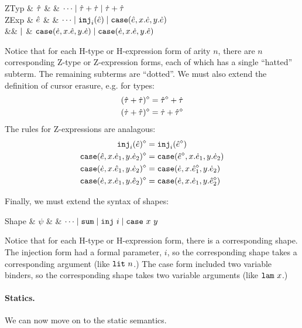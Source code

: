 \begin{grammar}
\textsf{ZTyp} & $\hat{\tau}$ & \bnfas & $\cdots \mathrel{\mid} {\hat{\tau}} + {\dot{\tau}} \mathrel{\mid} {\dot{\tau}} + {\hat{\tau}}$
\\
\textsf{ZExp} & $\hat{e}$ & \bnfas & $\cdots
\mathrel{\mid} \texttt{inj}_{i}({\hat{e}})
\mathrel{\mid} \texttt{case}({\hat{e}},{x}.{\dot{e}},{y}.{\dot{e}})$
\\
&& $\mathrel{\mid}$ & $\texttt{case}({\dot{e}},{x}.{\hat{e}},{y}.{\dot{e}})
\mathrel{\mid}\texttt{case}({\dot{e}},{x}.{\dot{e}},{y}.{\hat{e}})$
\end{grammar}
Notice that for each H-type or H-expression form of arity $n$, there are $n$ corresponding Z-type or Z-expression forms, each of which has a single ``hatted'' subterm. The remaining subterms are ``dotted''. We must also extend the definition of cursor erasure, e.g. for types:
\begin{align*}
(\hat{\tau} + \dot{\tau})^{\diamond} & = \hat{\tau}^{\diamond} + \dot{\tau}\\
(\dot{\tau} + \hat{\tau})^{\diamond} & = \dot{\tau} + \hat{\tau}^{\diamond}
\end{align*}
The rules for Z-expressions are analagous:
\begin{align*}
\texttt{inj}_{i}({\hat{e}})^{\diamond} & = \texttt{inj}_{i}({\hat{e}^{\diamond}})\\
\texttt{case}({\hat{e}},{x}.{\dot{e}_1},{y}.{\dot{e}_2})^{\diamond} & = \texttt{case}({\hat{e}^{\diamond}},{x}.{\dot{e}_1},{y}.{\dot{e}_2})\\
\texttt{case}({\dot{e}},{x}.{\hat{e}_1},{y}.{\dot{e}_2})^{\diamond} & = \texttt{case}({\dot{e}},{x}.{\hat{e}_1^{\diamond}},{y}.{\dot{e}_2})\\
\texttt{case}({\dot{e}},{x}.{\dot{e}_1},{y}.{\hat{e}_2})^{\diamond} & = \texttt{case}({\dot{e}},{x}.{\dot{e}_1},{y}.{\hat{e}_2^{\diamond}})
\end{align*} 

Finally, we must extend the syntax of shapes:
\begin{grammar}
\textsf{Shape} & $\psi$ & \bnfas & $\cdots \mathrel{\mid} \mathtt{sum} \mathrel{\mid} \mathtt{inj}~i \mathrel{\mid} \mathtt{case}~x~y$
\end{grammar}
Notice that for each H-type or H-expression form, there is a corresponding shape. The injection form had a formal parameter, $i$, so the corresponding shape takes a corresponding argument (like $\mathtt{lit}~n$.) The case form included two variable binders, so the corresponding shape takes two variable arguments (like $\mathtt{lam}~x$.)



\paragraph{Statics.}
We can now move on to the static semantics. 

